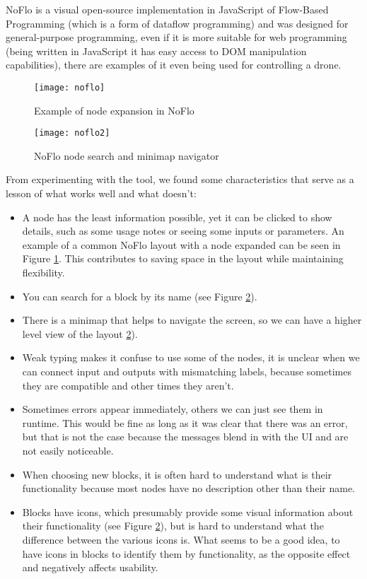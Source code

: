 NoFlo is a visual open-source implementation in JavaScript of Flow-Based Programming \cite{noflo}
(which is a form of dataflow programming) and was designed for general-purpose
programming, even if it is more suitable for web programming (being written in
JavaScript it has easy access to DOM manipulation capabilities), there are
examples of it even being used for controlling a drone.

\begin{figure}[t]
  \begin{center}
    \leavevmode
    \texttt{[image: noflo]}
    \caption{Example of node expansion in NoFlo \cite{noflo}}
    \label{fig:noflo}
  \end{center}
\end{figure}

\begin{figure}[t]
  \begin{center}
    \leavevmode
    \texttt{[image: noflo2]}
    \caption{NoFlo node search and minimap navigator \cite{noflo}}
    \label{fig:noflo2}
  \end{center}
\end{figure}

From experimenting with the tool, we found some characteristics that serve as a
lesson of what works well and what doesn't:

\begin{itemize}
  \item A node has the least information possible, yet it can be clicked to
show details, such as some usage notes or seeing some inputs or parameters.
An example of a common NoFlo layout with a node expanded can be seen in Figure
\ref{fig:noflo}. This contributes to saving space in the layout while maintaining
flexibility.
  \item You can search for a block by its name (see Figure \ref{fig:noflo2}).
  \item There is a minimap that helps to navigate the screen, so we can have
a higher level view of the layout \ref{fig:noflo2}).
  \item Weak typing makes it confuse to use some of the nodes, it is unclear
when we can connect input and outputs with mismatching labels, because sometimes
they are compatible and other times they aren't.
  \item Sometimes errors appear immediately, others we can just see them in
runtime. This would be fine as long as it was clear that there was an error,
but that is not the case because the messages blend in with the UI and are
not easily noticeable.
  \item When choosing new blocks, it is often hard to understand what is their
functionality because most nodes have no description other than their name.
  \item Blocks have icons, which presumably provide some visual information
about their functionality (see Figure \ref{fig:noflo2}), but is hard to
understand what the difference between the various icons is. What seems to be a
good idea, to have icons in blocks to identify them by functionality, as the
opposite effect and negatively affects usability.
\end{itemize}

